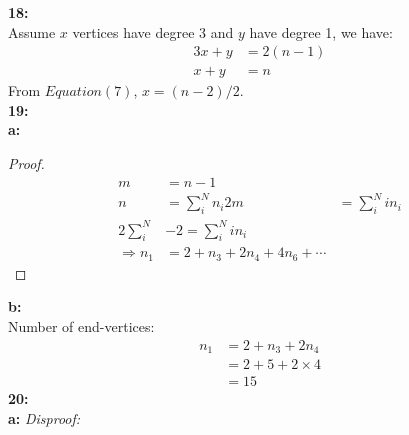 \documentclass{article}
\begin{document}
\textbf{18:}\\
Assume $x$ vertices have degree 3 and $y$ have degree 1, we have:
\begin{equation}
\begin{aligned}
3x+y&=2(n-1)\\
x+y&=n
\end{aligned}
\end{equation}
From $Equation(7)$, $x=(n-2)/2$.\\
\textbf{19:}\\
\textbf{a:}
\begin{proof}
\begin{equation*}
\begin{aligned}
m&=n-1\\
n&=\sum_i^N n_i
2m&=\sum_i^N in_i\\
2\sum_i^N&-2
=\sum_i^N in_i\\
\Rightarrow n_1&=2+n_3+2n_4+4n_6+\cdots
\end{aligned}
\end{equation*}
\end{proof}
\textbf{b:}\\
Number of end-vertices:
\[
\begin{aligned}
n_1&=2+n_3+2n_4\\
&=2+5+2\times 4\\
&=15
\end{aligned}
\]
\textbf{20:}\\
\textbf{a:}
\emph{Disproof:}\\
\end{document}
